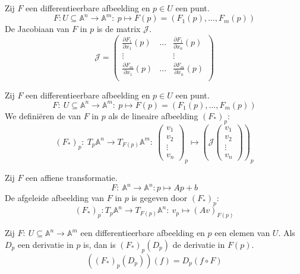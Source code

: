 \documentclass[main.tex]{subfiles}
\begin{document}
\begin{de}
  Zij $F$ een differentieerbare afbeelding en $p \in U$ een punt.
  \[ F: U\subseteq \mathbb{A}^{n} \rightarrow \mathbb{A}^{m}:\ p\mapsto F(p) = (F_{1}(p),\dotsc,F_{m}(p)) \]
  De Jacobiaan van $F$ in $p$ is de matrix $\mathcal{J}$.
  \[
  \mathcal{J} = 
  \begin{pmatrix}
  \frac{\partial F_{1}}{\partial x_{1}}(p) & \hdots & \frac{\partial F_{1}}{\partial x_{n}}(p)\\
  \vdots & & \vdots\\
  \frac{\partial F_{m}}{\partial x_{1}}(p) & \hdots & \frac{\partial F_{m}}{\partial x_{n}}(p)\\
  \end{pmatrix}
  \]  
\end{de}

\begin{de}
  Zij $F$ een differentieerbare afbeelding en $p \in U$ een punt.
  \[ F:\ U\subseteq \mathbb{A}^{n} \rightarrow \mathbb{A}^{m}:\ p\mapsto F(p) = (F_{1}(p),\dotsc,F_{m}(p)) \]
  We defini\"eren de  van $F$ in $p$ als de lineaire afbeelding $(F_{*})_{p}$:
  \[
  (F_{*})_{p}:\ T_{p}\mathbb{A}^{n}\rightarrow T_{F(p)}\mathbb{A}^{m}:\
  \begin{pmatrix}
    v_{1}\\v_{2}\\\vdots\\v_{n}
  \end{pmatrix}_{p}
  \mapsto
  \left(
  \mathcal{J}
  \begin{pmatrix}
    v_{1}\\v_{2}\\\vdots\\v_{n}
  \end{pmatrix}
  \right)_{p} 
  \]
\end{de}

\begin{lem}
  Zij $F$ een affiene transformatie.
  \[ F:\ \mathbb{A}^{n} \rightarrow \mathbb{A}^{n}: p\mapsto Ap + b \]
  De afgeleide afbeelding van $F$ in $p$ is gegeven door $(F_{*})_{p}$:
  \[ (F_{*})_{p}: T_{p}\mathbb{A}^{n} \rightarrow T_{F(p)}\mathbb{A}^{n}:\ v_{p} \mapsto (Av)_{F(p)} \]
  \TODO{bewijs p 68}
\end{lem}

\begin{st}
  Zij $F:\ U\subseteq \mathbb{A}^{n} \rightarrow \mathbb{A}^{m}$ een differentieerbare afbeelding en $p$ een elemen van $U$.
  Als $D_{p}$ een derivatie in $p$ is, dan is $(F_{*})_{p}(D_{p})$ de derivatie in $F(p)$.
  \[ \left( (F_{*})_{p}(D_{p})\right) (f) = D_{p} (f\circ F) \]
\end{st}
\end{document}
